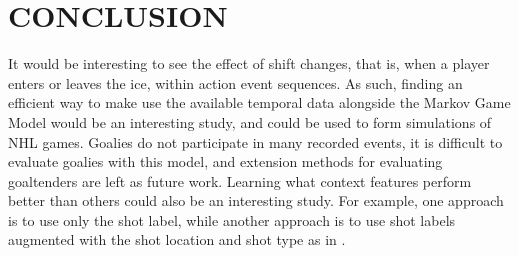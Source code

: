 \documentclass[]{article}
\begin{document}





\section{CONCLUSION}

It would be interesting to see the effect of shift changes, that is, when a player enters or leaves the ice, within action event sequences. As such, finding an efficient way to make use the available temporal data alongside the Markov Game Model would be an interesting study, and could be used to form simulations of NHL games. Goalies do not participate in many recorded events, it is difficult to evaluate goalies with this model, and extension methods for evaluating goaltenders are left as future work. Learning what context features perform better than others could also be an interesting study. For example, one approach is to use only the shot label, while another approach is to use shot labels augmented with the shot location and shot type as in \citep{Krzywicki2005}.
\end{document}
